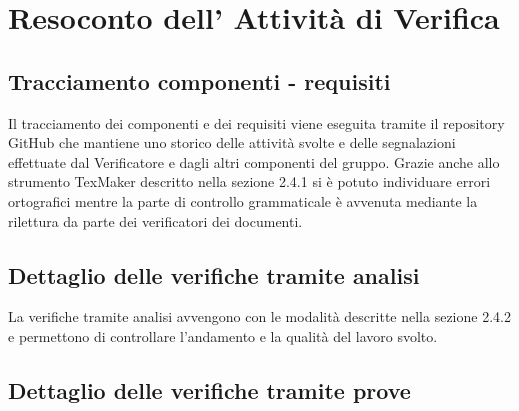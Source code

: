 \section{Resoconto dell' Attività di Verifica}

\subsection{Tracciamento componenti - requisiti}
Il tracciamento dei componenti e dei requisiti viene eseguita tramite il repository GitHub che mantiene uno storico delle attività svolte e delle segnalazioni effettuate dal Verificatore e dagli altri componenti del gruppo.
Grazie anche allo strumento TexMaker descritto nella sezione 2.4.1 si è potuto individuare errori ortografici mentre la parte di controllo grammaticale è avvenuta mediante la rilettura da parte dei verificatori dei documenti. 
\subsection{Dettaglio delle verifiche tramite analisi}
La verifiche tramite analisi avvengono con le modalità descritte nella sezione 2.4.2 e permettono di controllare l'andamento e la qualità del lavoro svolto. 
\subsection{Dettaglio delle verifiche tramite prove}
